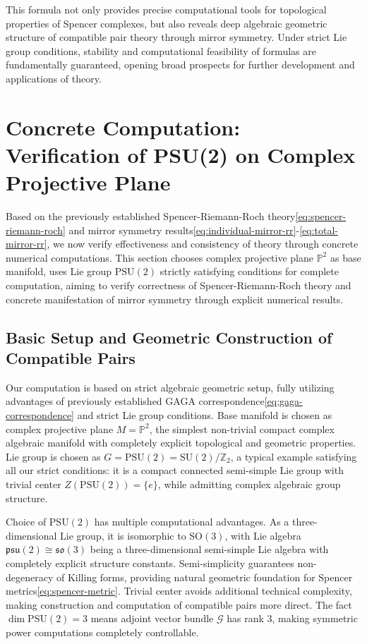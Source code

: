 \documentclass[a4paper,12pt]{extarticle}
\theoremstyle{definition}
\begin{document}
This formula not only provides precise computational tools for topological properties of Spencer complexes, but also reveals deep algebraic geometric structure of compatible pair theory through mirror symmetry. Under strict Lie group conditions, stability and computational feasibility of formulas are fundamentally guaranteed, opening broad prospects for further development and applications of theory.

\section{Concrete Computation: Verification of PSU(2) on Complex Projective Plane}

Based on the previously established Spencer-Riemann-Roch theory\eqref{eq:spencer-riemann-roch} and mirror symmetry results\eqref{eq:individual-mirror-rr}-\eqref{eq:total-mirror-rr}, we now verify effectiveness and consistency of theory through concrete numerical computations. This section chooses complex projective plane $\mathbb{P}^2$ as base manifold, uses Lie group $\text{PSU}(2)$ strictly satisfying conditions for complete computation, aiming to verify correctness of Spencer-Riemann-Roch theory and concrete manifestation of mirror symmetry through explicit numerical results.

\subsection{Basic Setup and Geometric Construction of Compatible Pairs}

Our computation is based on strict algebraic geometric setup, fully utilizing advantages of previously established GAGA correspondence\eqref{eq:gaga-correspondence} and strict Lie group conditions. Base manifold is chosen as complex projective plane $M = \mathbb{P}^2$, the simplest non-trivial compact complex algebraic manifold with completely explicit topological and geometric properties\cite{griffiths1978principles}. Lie group is chosen as $G = \text{PSU}(2) = \text{SU}(2)/\mathbb{Z}_2$, a typical example satisfying all our strict conditions: it is a compact connected semi-simple Lie group with trivial center $Z(\text{PSU}(2)) = \{e\}$, while admitting complex algebraic group structure.

Choice of $\text{PSU}(2)$ has multiple computational advantages. As a three-dimensional Lie group, it is isomorphic to $\text{SO}(3)$, with Lie algebra $\mathfrak{psu}(2) \cong \mathfrak{so}(3)$ being a three-dimensional semi-simple Lie algebra with completely explicit structure constants. Semi-simplicity guarantees non-degeneracy of Killing forms, providing natural geometric foundation for Spencer metrics\eqref{eq:spencer-metric}. Trivial center avoids additional technical complexity, making construction and computation of compatible pairs more direct. The fact $\dim \text{PSU}(2) = 3$ means adjoint vector bundle $\mathcal{G}$ has rank 3, making symmetric power computations completely controllable.
\end{document}
